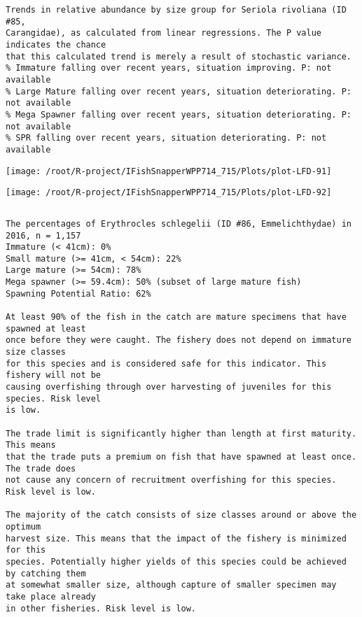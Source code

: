 \documentclass{report}\usepackage[]{graphicx}\usepackage[]{color}
\makeatletter
\def\maxwidth{ %
  \ifdim\Gin@nat@width>\linewidth
    \linewidth
  \else
    \Gin@nat@width
  \fi
}
\newenvironment{kframe}{%
 \def\at@end@of@kframe{}%
 \ifinner\ifhmode%
  \def\at@end@of@kframe{\end{minipage}}%
  \begin{minipage}{\columnwidth}%
 \fi\fi%
 \def\FrameCommand##1{\hskip\@totalleftmargin \hskip-\fboxsep
 \colorbox{shadecolor}{##1}\hskip-\fboxsep
     \hskip-\linewidth \hskip-\@totalleftmargin \hskip\columnwidth}%
 \MakeFramed {\advance\hsize-\width
   \@totalleftmargin\z@ \linewidth\hsize
   \@setminipage}}%
 {\par\unskip\endMakeFramed%
 \at@end@of@kframe}
\newenvironment{knitrout}{}{} %
\makeatother
\begin{document}
\begin{knitrout}
\begin{kframe}
\begin{verbatim}
Trends in relative abundance by size group for Seriola rivoliana (ID #85,
Carangidae), as calculated from linear regressions. The P value indicates the chance
that this calculated trend is merely a result of stochastic variance.
% Immature falling over recent years, situation improving. P: not available
% Large Mature falling over recent years, situation deteriorating. P: not available
% Mega Spawner falling over recent years, situation deteriorating. P: not available
% SPR falling over recent years, situation deteriorating. P: not available
\end{verbatim}
\end{kframe}
\texttt{[image: /root/R-project/IFishSnapperWPP714\_715/Plots/plot-LFD-91]} 

\texttt{[image: /root/R-project/IFishSnapperWPP714\_715/Plots/plot-LFD-92]} 
\begin{kframe}\begin{verbatim}
\end{verbatim}
\end{kframe}
\clearpage
\newpage
\begin{kframe}\begin{verbatim}The percentages of Erythrocles schlegelii (ID #86, Emmelichthydae) in 2016, n = 1,157
Immature (< 41cm): 0%
Small mature (>= 41cm, < 54cm): 22%
Large mature (>= 54cm): 78%
Mega spawner (>= 59.4cm): 50% (subset of large mature fish)
Spawning Potential Ratio: 62%
 
At least 90% of the fish in the catch are mature specimens that have spawned at least
once before they were caught. The fishery does not depend on immature size classes
for this species and is considered safe for this indicator. This fishery will not be
causing overfishing through over harvesting of juveniles for this species. Risk level
is low.

The trade limit is significantly higher than length at first maturity.  This means
that the trade puts a premium on fish that have spawned at least once. The trade does
not cause any concern of recruitment overfishing for this species. Risk level is low.

The majority of the catch consists of size classes around or above the optimum
harvest size. This means that the impact of the fishery is minimized for this
species. Potentially higher yields of this species could be achieved by catching them
at somewhat smaller size, although capture of smaller specimen may take place already
in other fisheries. Risk level is low.


\end{verbatim}
\end{kframe}
\end{knitrout}
\end{document}
